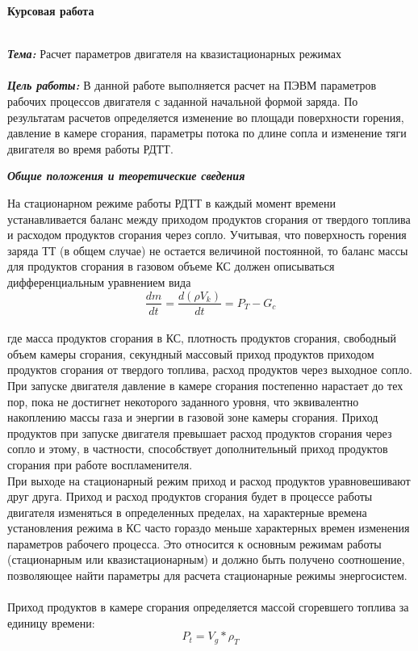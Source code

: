 \begin{center}
\textbf{Курсовая работа}\\
\end{center}
~\\
\textbf{\textit{Тема:}}
Расчет параметров двигателя на квазистационарных режимах\\
~\\
\textbf{\textit{Цель работы:}}
В данной работе выполняется расчет на ПЭВМ параметров рабочих процессов двигателя с заданной начальной формой заряда. По результатам расчетов определяется изменение во площади поверхности горения, давление в камере сгорания, параметры потока по длине сопла и изменение тяги двигателя во время работы РДТТ.
\begin{center}
\textbf{\textit{Общие положения и теоретические сведения}}

\end{center}
На стационарном режиме работы РДТТ в каждый момент времени устанавливается баланс между приходом продуктов сгорания от твердого топлива и расходом продуктов сгорания через сопло. Учитывая, что поверхность горения заряда ТТ (в общем случае) не остается величиной постоянной, то баланс массы для продуктов сгорания в газовом объеме КС должен описываться дифференциальным уравнением вида
\begin{equation}\label{eq:fourierrow} 
\frac{dm}{dt}= \frac{d(\rho V_k)}{dt} = P_T - G_c
\end{equation}\\
где масса продуктов сгорания в КС, плотность продуктов сгорания, свободный объем камеры сгорания, секундный массовый приход продуктов приходом продуктов сгорания от твердого топлива, расход продуктов через выходное сопло.\\
При запуске двигателя давление в камере сгорания постепенно нарастает до тех пор, пока не достигнет некоторого заданного уровня, что эквивалентно накоплению массы газа и энергии в газовой зоне камеры сгорания. Приход продуктов при запуске двигателя превышает расход продуктов сгорания через сопло и этому, в частности, способствует дополнительный приход продуктов сгорания при работе воспламенителя.\\
При выходе на стационарный режим приход и расход продуктов уравновешивают друг друга. Приход и расход продуктов сгорания будет в процессе работы двигателя изменяться в определенных пределах, на характерные времена установления режима в КС часто гораздо меньше характерных времен изменения параметров рабочего процесса. Это относится к основным режимам работы (стационарным или квазистационарным) и должно быть получено соотношение, позволяющее найти параметры для расчета стационарные режимы энергосистем.\\
~\\
Приход продуктов в камере сгорания определяется массой сгоревшего топлива за единицу времени: \\
\begin{equation}\label{eq:fourierrow} 
P_t = V_g * \rho_T 
\end{equation}\\


